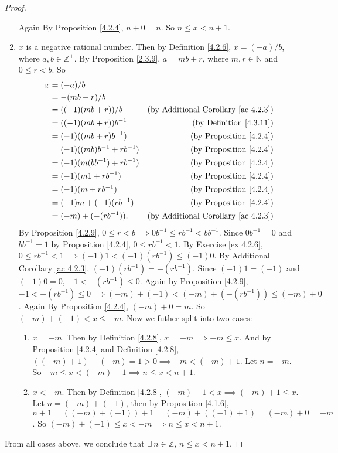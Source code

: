 \begin{proof}
\begin{enumerate}
    Again By Proposition \ref{4.2.4}, \(n + 0 = n\).
    So \(n \leq x < n + 1\).
    \item \(x\) is a negative rational number.
    Then by Definition \ref{4.2.6}, \(x = (-a) / b\), where \(a, b \in \mathds{Z}^+\).
    By Proposition \ref{2.3.9}, \(a = mb + r\), where \(m, r \in \mathds{N}\) and \(0 \leq r < b\).
    So
    \begin{align*}
    x &= (-a) / b \\
    &= -(mb + r) / b \\
    &= ((-1)(mb + r)) / b & \text{(by Additional Corollary \ref{ac 4.2.3})} \\
    &= ((-1)(mb + r))b^{-1} & \text{(by Definition \ref{4.3.11})} \\
    &= (-1)((mb + r)b^{-1}) & \text{(by Proposition \ref{4.2.4})} \\
    &= (-1)((mb)b^{-1} + rb^{-1}) & \text{(by Proposition \ref{4.2.4})} \\
    &= (-1)(m(bb^{-1}) + rb^{-1}) & \text{(by Proposition \ref{4.2.4})} \\
    &= (-1)(m1 + rb^{-1}) & \text{(by Proposition \ref{4.2.4})} \\
    &= (-1)(m + rb^{-1}) & \text{(by Proposition \ref{4.2.4})} \\
    &= (-1)m + (-1)(rb^{-1}) & \text{(by Proposition \ref{4.2.4})} \\
    &= (-m) + (-(rb^{-1})). & \text{(by Additional Corollary \ref{ac 4.2.3})} \\
    \end{align*}
    By Proposition \ref{4.2.9}, \(0 \leq r < b \implies 0b^{-1} \leq rb^{-1} < bb^{-1}\).
    Since \(0b^{-1} = 0\) and \(bb^{-1} = 1\) by Proposition \ref{4.2.4}, \(0 \leq rb^{-1} < 1\).
    By Exercise \ref{ex 4.2.6}, \(0 \leq rb^{-1} < 1 \implies (-1)1 < (-1)(rb^{-1}) \leq (-1)0\).
    By Additional Corollary \ref{ac 4.2.3}, \((-1)(rb^{-1}) = -(rb^{-1})\).
    Since \((-1)1 = (-1)\) and \((-1)0 = 0\), \(-1 < -(rb^{-1}) \leq 0\).
    Again by Proposition \ref{4.2.9}, \(-1 < -(rb^{-1}) \leq 0 \implies (-m) + (-1) < (-m) + (-(rb^{-1})) \leq (-m) + 0\).
    Again By Proposition \ref{4.2.4}, \((-m) + 0 = m\).
    So \((-m) + (-1) < x \leq -m\).
    Now we futher split into two cases:
    \begin{enumerate}[label=(\roman*)]
        \item \(x = -m\).
        Then by Definition \ref{4.2.8}, \(x = -m \implies -m \leq x\).
        And by Proposition \ref{4.2.4} and Definition \ref{4.2.8}, \(((-m) + 1) - (-m) = 1 > 0 \implies -m < (-m) + 1\).
        Let \(n = -m\).
        So \(-m \leq x < (-m) + 1 \implies n \leq x < n + 1\).
        \item \(x < -m\).
        Then by Definition \ref{4.2.8}, \((-m) + 1 < x \implies (-m) + 1 \leq x\).
        Let \(n = (-m) + (-1)\), then by Proposition \ref{4.1.6}, \(n + 1 = ((-m) + (-1)) + 1 = (-m) + ((-1) + 1) = (-m) + 0 = -m\).
        So \((-m) + (-1) \leq x < -m \implies n \leq x < n + 1\).
    \end{enumerate}
\end{enumerate}
From all cases above, we conclude that \(\exists\ n \in \mathds{Z}\), \(n \leq x < n + 1\).


\end{proof}
